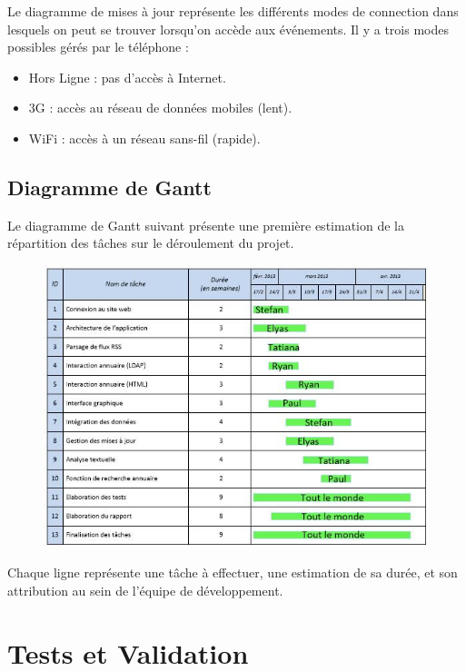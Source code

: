 \documentclass [pdftex,12pt] {report}
\begin{document}
Le diagramme de mises à jour représente les différents modes de connection dans lesquels on peut se trouver lorsqu'on accède aux événements. Il y a trois modes possibles gérés par le téléphone :\\
\begin{itemize}
\renewcommand{\labelitemi}{$\bullet$}
 \item Hors Ligne : pas d'accès à Internet.
 \item 3G :  accès au réseau de données mobiles (lent).
 \item WiFi : accès à un réseau sans-fil (rapide).
\end{itemize}

\newpage

\section{Diagramme de Gantt}
Le diagramme de Gantt suivant présente une première estimation de la répartition des tâches sur le déroulement du projet. 

\begin{figure}[h]
  \center
  \includegraphics[width=1.0\textwidth]{resources/gantt.jpg}
\end{figure}

Chaque ligne représente une tâche à effectuer, une estimation de sa durée, et son attribution au sein de l'équipe de développement. \\


\chapter{Tests et Validation}
  
\end{document}
